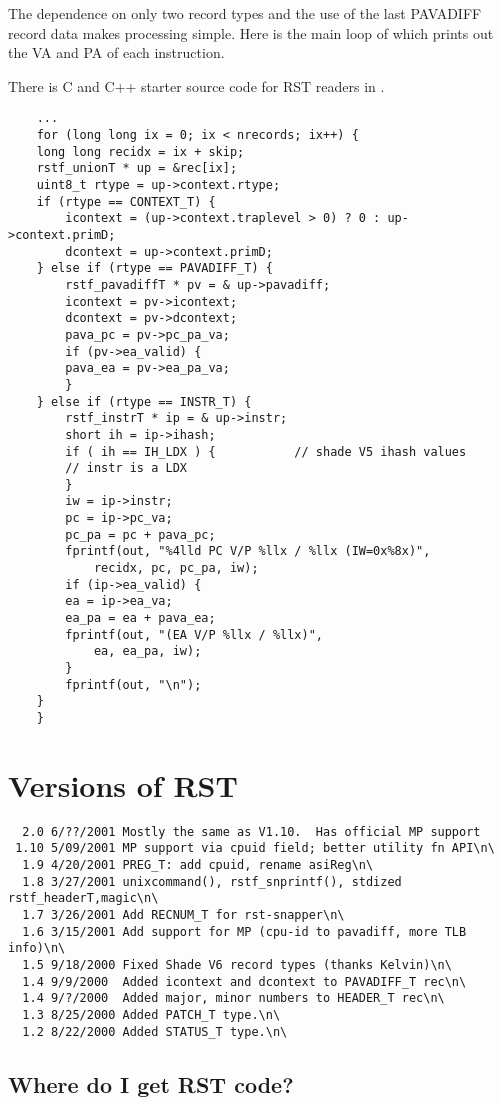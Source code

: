 \documentclass[10pt]{article}
\begin{document}
The dependence on only two record types and the use of the last PAVADIFF
record data makes processing simple.  Here is the main loop of
 which prints out the VA and PA of each instruction.

There is C and C++ starter source code for RST readers in
.

\begin{verbatim}
    ...
    for (long long ix = 0; ix < nrecords; ix++) {
	long long recidx = ix + skip;
	rstf_unionT * up = &rec[ix];
	uint8_t rtype = up->context.rtype;
	if (rtype == CONTEXT_T) {
	    icontext = (up->context.traplevel > 0) ? 0 : up->context.primD;
	    dcontext = up->context.primD;
	} else if (rtype == PAVADIFF_T) {
	    rstf_pavadiffT * pv = & up->pavadiff;
	    icontext = pv->icontext;
	    dcontext = pv->dcontext;
	    pava_pc = pv->pc_pa_va;
	    if (pv->ea_valid) {
		pava_ea = pv->ea_pa_va;
	    }
	} else if (rtype == INSTR_T) {
	    rstf_instrT * ip = & up->instr;
	    short ih = ip->ihash;
	    if ( ih == IH_LDX ) {           // shade V5 ihash values
		// instr is a LDX
	    }
	    iw = ip->instr;
	    pc = ip->pc_va;
	    pc_pa = pc + pava_pc;
	    fprintf(out, "%4lld PC V/P %llx / %llx (IW=0x%8x)",
		    recidx, pc, pc_pa, iw);
	    if (ip->ea_valid) {
		ea = ip->ea_va;
		ea_pa = ea + pava_ea;
		fprintf(out, "(EA V/P %llx / %llx)",
			ea, ea_pa, iw);
	    }
	    fprintf(out, "\n");
	}
    }
\end{verbatim}


\section{Versions of RST}

\begin{verbatim}
  2.0 6/??/2001 Mostly the same as V1.10.  Has official MP support
 1.10 5/09/2001 MP support via cpuid field; better utility fn API\n\
  1.9 4/20/2001 PREG_T: add cpuid, rename asiReg\n\
  1.8 3/27/2001 unixcommand(), rstf_snprintf(), stdized rstf_headerT,magic\n\
  1.7 3/26/2001 Add RECNUM_T for rst-snapper\n\
  1.6 3/15/2001 Add support for MP (cpu-id to pavadiff, more TLB info)\n\
  1.5 9/18/2000 Fixed Shade V6 record types (thanks Kelvin)\n\
  1.4 9/9/2000  Added icontext and dcontext to PAVADIFF_T rec\n\
  1.4 9/?/2000  Added major, minor numbers to HEADER_T rec\n\
  1.3 8/25/2000 Added PATCH_T type.\n\
  1.2 8/22/2000 Added STATUS_T type.\n\
\end{verbatim}

\subsection{Where do I get RST code?}
\end{document}
